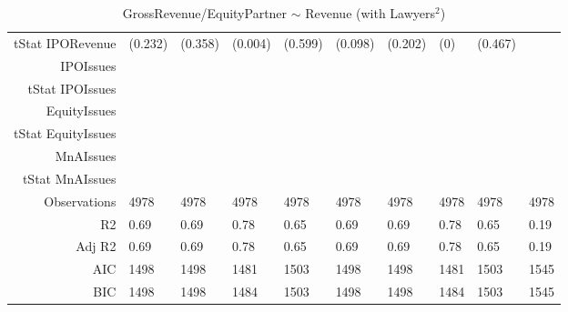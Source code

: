 \begin{table}[ht]
\begin{tabular}{rlllllllll}
  tStat IPORevenue & (0.232) & (0.358) & (0.004) & (0.599) & (0.098) & (0.202) & (0) & (0.467) &  \\ 
  IPOIssues &  &  &  &  &  &  &  &  &  \\ 
  tStat IPOIssues &  &  &  &  &  &  &  &  &  \\ 
  EquityIssues &  &  &  &  &  &  &  &  &  \\ 
  tStat EquityIssues &  &  &  &  &  &  &  &  &  \\ 
  MnAIssues &  &  &  &  &  &  &  &  &  \\ 
  tStat MnAIssues &  &  &  &  &  &  &  &  &  \\ 
  Observations & 4978 & 4978 & 4978 & 4978 & 4978 & 4978 & 4978 & 4978 & 4978 \\ 
  R2 & 0.69 & 0.69 & 0.78 & 0.65 & 0.69 & 0.69 & 0.78 & 0.65 & 0.19 \\ 
  Adj R2 & 0.69 & 0.69 & 0.78 & 0.65 & 0.69 & 0.69 & 0.78 & 0.65 & 0.19 \\ 
  AIC & 1498 & 1498 & 1481 & 1503 & 1498 & 1498 & 1481 & 1503 & 1545 \\ 
  BIC & 1498 & 1498 & 1484 & 1503 & 1498 & 1498 & 1484 & 1503 & 1545 \\ 
   \hline
\end{tabular}
\caption{GrossRevenue/EquityPartner $\sim$ Revenue (with Lawyers$^2$)} 
\end{table}
